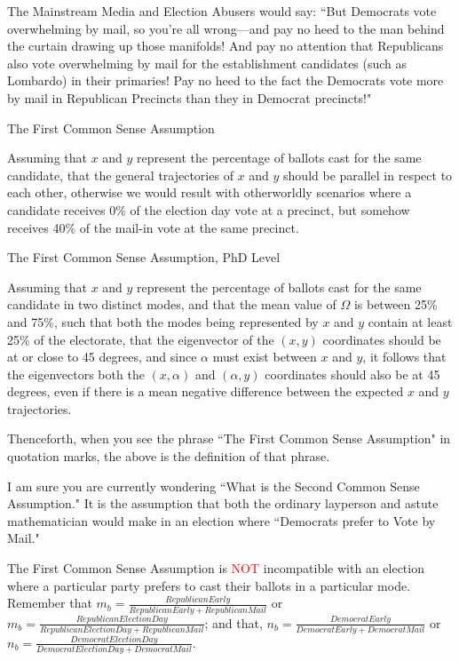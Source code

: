 The Mainstream Media and Election Abusers would say: ``But Democrats vote overwhelming by mail, so you're all wrong---and pay no heed to the man behind the curtain drawing up those manifolds! And pay no attention that Republicans also vote overwhelming by mail for the establishment candidates (such as Lombardo) in their primaries! Pay no heed to the fact the Democrats vote more by mail in Republican Precincts than they in Democrat precincts!"
\begin{definition}{The First Common Sense Assumption}

Assuming that $x$ and $y$ represent the percentage of ballots cast for the same candidate, that the general trajectories of $x$ and $y$ should be parallel in respect to each other, otherwise we would result with otherworldly scenarios where a candidate receives 0\% of the election day vote at a precinct, but somehow receives 40\% of the mail-in vote at the same precinct.
\end{definition}

\begin{definition}{The First Common Sense Assumption, PhD Level}

Assuming that $x$ and $y$ represent the percentage of ballots cast for the same candidate in two distinct modes, and that the mean value of $\Omega$ is between 25\% and 75\%, such that both the modes being represented by $x$ and $y$ contain at least 25\% of the electorate, that the eigenvector of the $(x,y)$ coordinates should be at or close to 45 degrees, and since $\alpha$ must exist between $x$ and $y$, it follows that the eigenvectors both the $(x,\alpha)$ and $(\alpha,y)$ coordinates should also be at 45 degrees, even if there is a mean negative difference between the expected $x$ and $y$ trajectories.
\end{definition}

Thenceforth, when you see the phrase ``The First Common Sense Assumption" in quotation marks, the above is the definition of that phrase. 

I am sure you are currently wondering ``What is the Second Common Sense Assumption." It is the assumption that both the ordinary layperson and astute mathematician would make in an election where ``Democrats prefer to Vote by Mail." 

The First Common Sense Assumption is \textcolor{red}{NOT} incompatible with an election where a particular party prefers to cast their ballots in a particular mode. Remember that $m_{b}=\frac{Republican Early}{Republican Early + Republican Mail}$ or $m_{b}=\frac{Republican Election Day}{Republican Election Day + Republican Mail}$; and that, $n_{b}=\frac{Democrat Early}{Democrat Early + Democrat Mail}$ or $n_{b}=\frac{Democrat Election Day}{Democrat Election Day + Democrat Mail}$.

